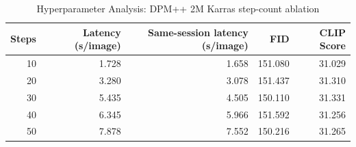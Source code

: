 
\begin{table}[htbp]
\centering
\caption{Hyperparameter Analysis: DPM++ 2M Karras step-count ablation}
\label{tab:member-b-steps}
\begin{tabular}{rrrrr}
\toprule
Steps & Latency (s/image) & Same-session latency (s/image) & FID & CLIP Score \\
\midrule
10 & 1.728 & 1.658 & 151.080 & 31.029 \\
20 & 3.280 & 3.078 & 151.437 & 31.310 \\
30 & 5.435 & 4.505 & 150.110 & 31.331 \\
40 & 6.345 & 5.966 & 151.592 & 31.256 \\
50 & 7.878 & 7.552 & 150.216 & 31.265 \\
\bottomrule
\end{tabular}
\end{table}
